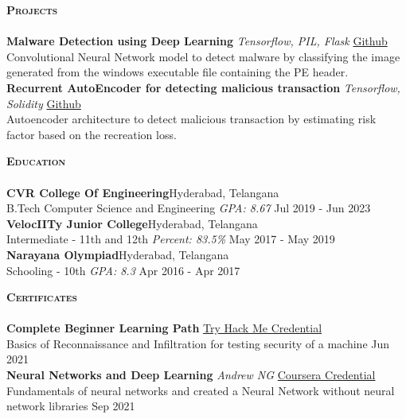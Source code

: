 \documentclass[a4paper]{article}
\newcommand{\lineunder} {
    \vspace*{-8pt} \\
    \hspace*{-18pt} \hrulefill \\
}
\newcommand{\header} [1] {
    {\hspace*{-18pt}\vspace*{6pt} \textbf{\textsc{#1}}}
    \vspace*{-6pt} \lineunder
}
\begin{document}
\begin{minipage}{\linewidth}
\header{Projects}
{\textbf{Malware Detection using Deep Learning}} {\sl Tensorflow, PIL, Flask} \hfill \href{https://github.com/pr1sm8/malware-detection-deep-learning}{Github \faExternalLink}\\
Convolutional Neural Network model to detect malware by classifying the image generated from the windows executable file containing the PE header.\\
{\textbf{Recurrent AutoEncoder for detecting malicious transaction}} {\sl Tensorflow, Solidity} \hfill \href{https://github.com/pr1sm8/secuRe-chAEn}{Github \faExternalLink}\\
Autoencoder architecture to detect malicious transaction by estimating risk factor based on the recreation loss.\\
\vspace{2mm}
\end{minipage}

\header{Education}
\textbf{CVR College Of Engineering}\hfill Hyderabad, Telangana\\
B.Tech Computer Science and Engineering \textit{GPA: 8.67} \hfill Jul 2019 - Jun 2023\\
\vspace{2mm}
\textbf{VelocIITy Junior College}\hfill Hyderabad, Telangana\\
Intermediate - 11th and 12th \textit{Percent: 83.5\%} \hfill May 2017 - May 2019\\
\vspace{2mm}
\textbf{Narayana Olympiad}\hfill Hyderabad, Telangana\\
Schooling - 10th \textit{GPA: 8.3} \hfill Apr 2016 - Apr 2017\\
\vspace{2mm}

\header{Certificates}
\textbf{Complete Beginner Learning Path} \hfill \href{https://tryhackme-certificates.s3-eu-west-1.amazonaws.com/THM-OIXBHRS7X7.pdf}{Try Hack Me Credential \faExternalLink} \\
Basics of Reconnaissance and Infiltration for testing security of a machine \hfill Jun 2021\\
\vspace{2mm}
\textbf{Neural Networks and Deep Learning} {\sl Andrew NG} \hfill \href{https://coursera.org/share/b5cc0dc1f8ac26b81d71d36fb3c30f1d}{Coursera Credential \faExternalLink} \\
Fundamentals of neural networks and created a Neural Network without neural network libraries \hfill Sep 2021\\
\vspace*{2mm}
\end{document}

